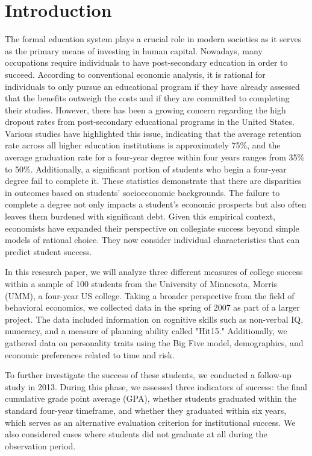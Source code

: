 \documentclass[12pt,a4paper]{article}
\begin{document}
\section{Introduction}
The formal education system plays a crucial role in modern societies as it serves as the primary means of investing in human capital. Nowadays, many occupations require individuals to have post-secondary education in order to succeed. According to conventional economic analysis, it is rational for individuals to only pursue an educational program if they have already assessed that the benefits outweigh the costs and if they are committed to completing their studies. However, there has been a growing concern regarding the high dropout rates from post-secondary educational programs in the United States. Various studies have highlighted this issue, indicating that the average retention rate across all higher education institutions is approximately 75\%, and the average graduation rate for a four-year degree within four years ranges from 35\% to 50\%. Additionally, a significant portion of students who begin a four-year degree fail to complete it. These statistics demonstrate that there are disparities in outcomes based on students' socioeconomic backgrounds. The failure to complete a degree not only impacts a student's economic prospects but also often leaves them burdened with significant debt. Given this empirical context, economists have expanded their perspective on collegiate success beyond simple models of rational choice. They now consider individual characteristics that can predict student success.\cite{article2}

In this research paper, we will analyze three different measures of college success within a sample of 100 students from the University of Minnesota, Morris (UMM), a four-year US college. Taking a broader perspective from the field of behavioral economics, we collected data in the spring of 2007 as part of a larger project. The data included information on cognitive skills such as non-verbal IQ, numeracy, and a measure of planning ability called "Hit15." Additionally, we gathered data on personality traits using the Big Five model, demographics, and economic preferences related to time and risk.

To further investigate the success of these students, we conducted a follow-up study in 2013. During this phase, we assessed three indicators of success: the final cumulative grade point average (GPA), whether students graduated within the standard four-year timeframe, and whether they graduated within six years, which serves as an alternative evaluation criterion for institutional success. We also considered cases where students did not graduate at all during the observation period.
\end{document}
